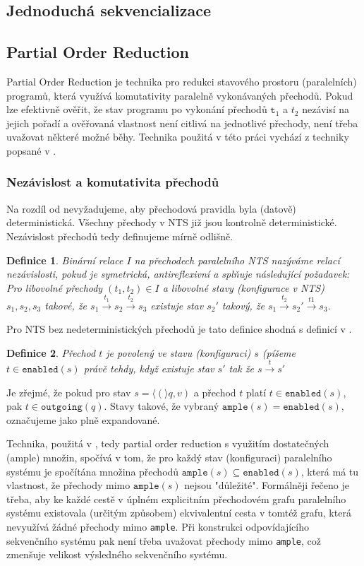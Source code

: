 \documentclass[10pt,a4paper,notitlepage]{report}
\newtheorem{definition}{Definice}
\newcommand{\tuple}[1]{\langle #1 \rangle}
\begin{document}
\subsection{Jednoduchá sekvencializace}


\subsection{Partial Order Reduction}
Partial Order Reduction je technika pro redukci stavového prostoru (paralelních) programů, která využívá komutativity paralelně vykonávaných přechodů. Pokud lze efektivně ověřit, že stav programu po vykonání přechodů $\texttt{t}_1$ a $t_2$ nezávisí na jejich pořadí a ověřovaná vlastnost není citlivá na jednotlivé přechody, není třeba uvažovat některé možné běhy. Technika použitá v této práci vychází z techniky popsané v \cite{CLARKE}.

\subsubsection{Nezávislost a komutativita přechodů}
Na rozdíl od \cite{CLARKE} nevyžadujeme, aby přechodová pravidla byla (datově) deterministická. Všechny přechody v NTS již jsou kontrolně deterministické. Nezávislost přechodů tedy definujeme mírně odlišně.
\begin{definition}
Binární relace $I$ na přechodech paralelního NTS nazýváme relací nezávislosti, pokud je symetrická, antireflexivní a splňuje následující požadavek:
Pro libovolné přechody $(t_1, t_2) \in I$ a libovolné stavy (konfigurace v NTS) $s_1, s_2, s_3$ takové, že  $s_1 \xrightarrow{t_1} s_2 \xrightarrow{t_2} s_3$ existuje stav $s_2'$ takový, že $s_1 \xrightarrow{t_2} s_2' \xrightarrow{t1} s_3$.
\end{definition}
Pro NTS bez nedeterministických přechodů je tato definice shodná s definicí v \cite{CLARKE}.

\begin{definition}
Přechod $t$ je povolený ve stavu (konfiguraci) $s$ (píšeme $t \in \texttt{enabled}(s)$ právě tehdy, když existuje stav $s'$ tak že $s \xrightarrow{t} s'$
\end{definition}
Je zřejmé, že pokud pro stav $s = \tuple(q, v)$ a přechod $t$ platí $t \in \texttt{enabled}(s)$, pak $t \in \texttt{outgoing}(q)$. Stavy takové, že vybraný $\texttt{ample}(s) = \texttt{enabled}(s)$, označujeme jako plně expandované.

Technika, použitá v \cite{CLARKE}, tedy partial order reduction s využitím dostatečných (ample) množin, spočívá v tom, že pro každý stav (konfiguraci) paralelního systému je spočítána množina přechodů $\texttt{ample}(s) \subseteq \texttt{enabled}(s)$, která má tu vlastnost, že přechody mimo $\texttt{ample}(s)$ nejsou "důležité". Formálněji řečeno je třeba, aby ke každé cestě v úplném explicitním přechodovém grafu paralelního systému existovala (určitým způsobem) ekvivalentní cesta v tomtéž grafu, která nevyužívá žádné přechody mimo \texttt{ample}. Při konstrukci odpovídajícího sekvenčního systému pak není třeba uvažovat přechody mimo \texttt{ample}, což zmenšuje velikost výsledného sekvenčního systému.
\end{document}

